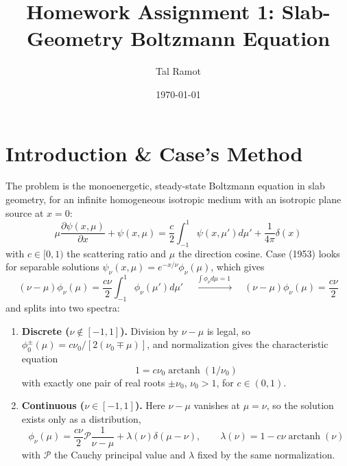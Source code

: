 \documentclass[11pt]{article}
\title{Homework Assignment 1: Slab-Geometry Boltzmann Equation}
\author{Tal Ramot}
\date{\today}
\begin{document}
\maketitle

\section*{Introduction \& Case's Method}

The problem is the monoenergetic, steady-state Boltzmann equation in slab geometry, for an infinite homogeneous isotropic medium with an isotropic plane source at $x = 0$:
\begin{equation}
    \mu \frac{\partial \psi(x, \mu)}{\partial x} + \psi(x, \mu) = \frac{c}{2} \int_{-1}^1 \psi(x, \mu') d\mu' + \frac{1}{4\pi} \delta(x)
\end{equation}
with $c \in [0, 1)$ the scattering ratio and $\mu$ the direction cosine. Case (1953) looks for separable solutions $\psi_\nu(x,\mu) = e^{-x/\nu}\phi_\nu(\mu)$, which gives
\begin{equation}
    (\nu - \mu) \phi_\nu(\mu) = \frac{c\nu}{2} \int_{-1}^1 \phi_\nu(\mu') d\mu'
    \quad \xrightarrow{\ \int \phi_\nu d\mu = 1\ } \quad
    (\nu - \mu) \phi_\nu(\mu) = \frac{c\nu}{2}
\end{equation}
and splits into two spectra:
\begin{enumerate}
    \item \textbf{Discrete ($\nu \notin [-1,1]$).} Division by $\nu - \mu$ is legal, so $\phi_0^{\pm}(\mu) = c\nu_0 / [2(\nu_0 \mp \mu)]$, and normalization gives the characteristic equation
    \begin{equation}
        1 = c\nu_0 \operatorname{arctanh}(1/\nu_0)
    \end{equation}
    with exactly one pair of real roots $\pm\nu_0$, $\nu_0 > 1$, for $c \in (0,1)$.

    \item \textbf{Continuous ($\nu \in [-1,1]$).} Here $\nu - \mu$ vanishes at $\mu = \nu$, so the solution exists only as a distribution,
    \begin{equation}
        \phi_\nu(\mu) = \frac{c\nu}{2} \mathcal{P} \frac{1}{\nu - \mu} + \lambda(\nu)\delta(\mu - \nu),
        \qquad \lambda(\nu) = 1 - c\nu \operatorname{arctanh}(\nu)
    \end{equation}
    with $\mathcal{P}$ the Cauchy principal value and $\lambda$ fixed by the same normalization.
\end{enumerate}
\end{document}
